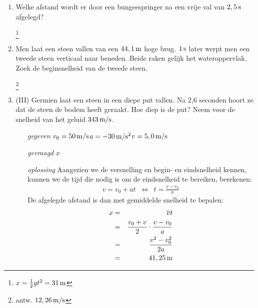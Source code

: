 \begin{enumerate}
\item Welke afstand wordt er door een bungeespringer na een vrije val van $2,5\rm\,s$ afgelegd?
\begin{oplossing}
\footnote{$x=\frac{1}{2}gt^2=31\rm\,m$}
\end{oplossing}







\item Men laat een steen vallen van een $44,1\rm\,m$ hoge brug. $1\rm\,s$ later werpt men een tweede steen verticaal naar beneden. Beide raken gelijk het wateroppervlak. Zoek de beginsnelheid van de tweede steen.
\begin{oplossing}
\footnote{antw. $12,26\rm\,m/s$}
\end{oplossing}












\item (III) Germien laat een steen in een diepe put vallen. Na 2,6 seconden hoort ze dat de steen de bodem heeft geraakt. Hoe diep is de put? Neem voor de snelheid van het geluid $343\rm\,m/s$.




\begin{oplossing}
\begin{enumerate}
\item[\textit{gegeven}]$v_0=50\rm\,m/s$\newline$a=-30\rm\,m/s^2$\newline$v=5,0\rm\,m/s$
\item[\textit{gevraagd}]$x$
\item[\textit{oplossing}]Aangezien we de versnelling en begin- en eindsnelheid kennen, kunnen we de tijd die nodig is om de eindsnelheid te bereiken, berekenen:
\begin{eqnarray*}
v=v_0+at&\Leftrightarrow&t=\frac{v-v_0}{a}
\end{eqnarray*}
De afgelegde afstand is dan met gemiddelde snelheid te bepalen:
\begin{eqnarray*}
x&=&\overline{v}t\\
&=&\frac{v_0+v}{2}\cdot\frac{v-v_0}{a}\\
&=&\frac{v^2-v_0^2}{2a}\\
&=&41,25\rm\,m
\end{eqnarray*}
\end{enumerate}
\end{oplossing}
	




\end{enumerate}

